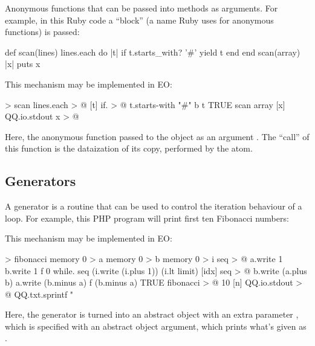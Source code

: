 \documentclass[sigplan,11pt,nonacm,natbib=false]{acmart}
\begin{document}
Anonymous functions that can be passed into methods as arguments. For example, in this Ruby code a ``block'' (a name Ruby uses for anonymous functions) is passed:

\begin{ffcode}
def scan(lines)
  lines.each do |t|
    if t.starts_with? '#' yield t
  end
end
scan(array) { |x| puts x }
\end{ffcode}

This mechanism may be implemented in EO:

\begin{ffcode}
[lines b] > scan
  lines.each > @
    [t]
      if. > @
        t.starts-with "#"
        b t
        TRUE
scan
  array
  [x]
    QQ.io.stdout x > @
\end{ffcode}

Here, the anonymous function passed to the object  as an argument . The ``call'' of this function is the dataization of its copy, performed by the  atom.

\subsection{Generators}
\label{sec:generators}

A generator is a routine that can be used to control the iteration behaviour of a loop. For example, this PHP program will print first ten Fibonacci numbers:


This mechanism may be implemented in EO:

\begin{ffcode}
[limit f] > fibonacci
  memory 0 > a
  memory 0 > b
  memory 0 > i
  seq > @
    a.write 1
    b.write 1
    f 0
    while.
      seq (i.write (i.plus 1)) (i.lt limit)
      [idx]
        seq > @
          b.write (a.plus b)
          a.write (b.minus a)
          f (b.minus a)
    TRUE
fibonacci > @
  10
  [n]
    QQ.io.stdout > @
      QQ.txt.sprintf "%
\end{ffcode}

Here, the generator is turned into an abstract object  with an extra parameter , which is specified with an abstract object argument, which prints what's given as .
\end{document}
